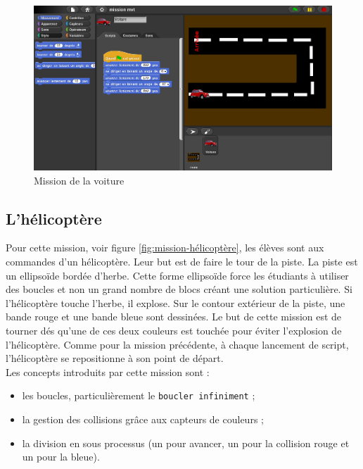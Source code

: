 \begin{figure}
  \begin{center}
    \includegraphics[width=\textwidth]{content/7-solution/1-missions/images/voiture}
    \caption{Mission de la voiture}
    \label{fig:mission-voiture}
  \end{center}
\end{figure}


\subsection{L'hélicoptère}
\label{mission-helicoptere}
Pour cette mission, voir figure \ref{fig:mission-hélicoptère}, les élèves sont aux commandes d'un hélicoptère. Leur but est de faire le tour de la piste. La piste est un ellipsoïde bordée d'herbe. Cette forme ellipsoïde force les étudiants à utiliser des boucles et non un grand nombre de blocs créant une solution particulière. Si l'hélicoptère touche l'herbe, il explose. Sur le contour extérieur de la piste, une bande rouge et une bande bleue sont dessinées. Le but de cette mission est de tourner dés qu'une de ces deux couleurs est touchée pour éviter l'explosion de l'hélicoptère. Comme pour la mission précédente, à chaque lancement de script, l'hélicoptère se repositionne à son point de départ.\\

Les concepts introduits par cette mission sont :
\begin{itemize}
\item les boucles, particulièrement le \texttt{boucler infiniment} ;
\item la gestion des collisions grâce aux capteurs de couleurs ;
\item la division en sous processus (un pour avancer, un pour la collision rouge et un pour la bleue).
\end{itemize}

